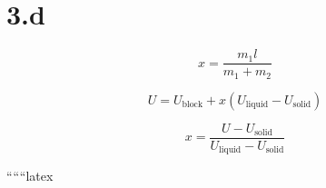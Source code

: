 \section*{3.d}

\[
x = \frac{m_1 l}{m_1 + m_2}
\]

\[
U = U_{\text{block}} + x \left( U_{\text{liquid}} - U_{\text{solid}} \right)
\]

\[
x = \frac{U - U_{\text{solid}}}{U_{\text{liquid}} - U_{\text{solid}}}
\]

``````latex